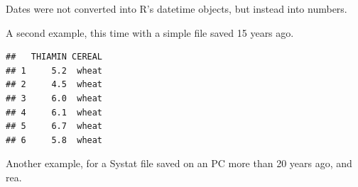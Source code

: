 \documentclass[krantz2,ChapterTOCs]{krantz}\usepackage{knitr}
\begin{document}
Dates were not converted into R's datetime objects, but instead into numbers.

A second example, this time with a simple  file saved 15 years ago.

\begin{knitrout}\footnotesize
{}\color{fgcolor}\begin{kframe}
\begin{alltt}
 \hlkwb{<-} \hlstd{(} \hlstd{=} \hlstd{,}  \hlstd{=} \hlstd{)}
\end{alltt}
\begin{verbatim}
##   THIAMIN CEREAL
## 1     5.2  wheat
## 2     4.5  wheat
## 3     6.0  wheat
## 4     6.1  wheat
## 5     6.7  wheat
## 6     5.8  wheat
\end{verbatim}
\end{kframe}
\end{knitrout}

Another example, for a Systat file saved on an PC more than 20 years ago, and rea.
\end{document}
